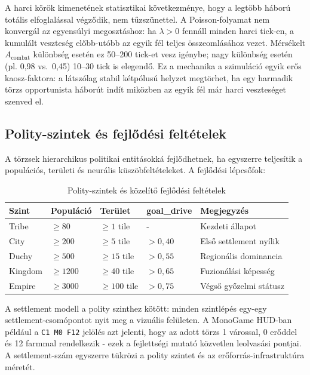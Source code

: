 ﻿\documentclass[a4paper,12pt]{report}
\begin{document}
A harci körök kimenetének statisztikai következménye, hogy a legtöbb háború
totális elfoglalással végződik, nem tűzszünettel. A Poisson-folyamat nem
konvergál az egyensúlyi megosztáshoz: ha $\lambda > 0$ fennáll minden harci
tick-en, a kumulált veszteség előbb-utóbb az egyik fél teljes összeomlásához
vezet. Mérsékelt $A_{\text{combat}}$ különbség esetén ez 50--200 tick-et vesz igénybe;
nagy különbség esetén (pl. 0{,}98 vs.\ 0{,}45) 10--30 tick is elegendő.
Ez a mechanika a szimuláció egyik erős kaosz-faktora: a látszólag stabil
kétpólusú helyzet megtörhet, ha egy harmadik törzs opportunista háborút indít
miközben az egyik fél már harci veszteséget szenved el.

\subsection*{Polity-szintek és fejlődési feltételek}

A törzsek hierarchikus politikai entitásokká fejlődhetnek, ha egyszerre teljesítik a populációs, területi és neurális küszöbfeltételeket. A fejlődési lépcsőfok:

\begin{table}[h]
\centering
\caption{Polity-szintek és közelítő fejlődési feltételek}
\label{tab:polity}
\begin{tabular}{lllll}
\hline
\textbf{Szint} & \textbf{Populáció} & \textbf{Terület} & \textbf{goal\_drive} & \textbf{Megjegyzés} \\
\hline
Tribe   & $\geq 80$    & $\geq 1$ tile    & -              & Kezdeti állapot \\
City    & $\geq 200$   & $\geq 5$ tile    & $> 0{,}40$     & Első settlement nyílik \\
Duchy   & $\geq 500$   & $\geq 15$ tile   & $> 0{,}55$     & Regionális dominancia \\
Kingdom & $\geq 1200$  & $\geq 40$ tile   & $> 0{,}65$     & Fuzionálási képesség \\
Empire  & $\geq 3000$  & $\geq 100$ tile  & $> 0{,}75$     & Végső győzelmi státusz \\
\hline
\end{tabular}
\end{table}

A settlement modell a polity szinthez kötött: minden szintlépés egy-egy settlement-csomópontot nyit meg a vizuális felületen. A MonoGame HUD-ban például a \texttt{C1 M0 F12} jelölés azt jelenti, hogy az adott törzs 1 várossal, 0 erőddel és 12 farmmal rendelkezik - ezek a fejlettségi mutató közvetlen leolvasási pontjai. A settlement-szám egyszerre tükrözi a polity szintet és az erőforrás-infrastruktúra méretét.
\end{document}
